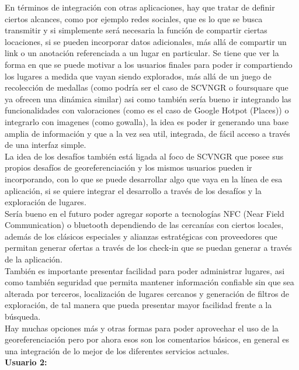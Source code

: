 \documentclass[10pt,letterpaper]{article}
\begin{document}
En términos de integración con otras aplicaciones, hay que tratar de definir ciertos alcances, como por ejemplo redes sociales, que es lo que se busca transmitir y si simplemente será necesaria la función de compartir ciertas locaciones, si se pueden incorporar datos adicionales, más allá de compartir un link o un anotación referenciada a un lugar en particular. Se tiene que ver la forma en que se puede motivar a los usuarios finales para poder ir compartiendo los lugares a medida que vayan siendo explorados, más allá de un juego de recolección de medallas (como podría ser el caso de SCVNGR o foursquare que ya ofrecen una dinámica similar) asi como también sería bueno ir integrando las funcionalidades con valoraciones (como es el caso de Google Hotpot (Places)) o integrarlo con imagenes (como gowalla), la idea es poder ir generando una base amplia de información y que a la vez sea util, integrada, de fácil acceso a través de una interfaz simple.\\

La idea de los desafíos también está ligada al foco de SCVNGR que posee sus propios desafíos de georeferenciación y los mismos usuarios pueden ir incorporando, con lo que se puede desarrollar algo que vaya en la línea de esa aplicación, si se quiere integrar el desarrollo a través de los desafíos y la exploración de lugares.\\

Sería bueno en el futuro poder agregar soporte a tecnologías NFC (Near Field Communication) o bluetooth dependiendo de las cercanías con ciertos locales, además de los clásicos especiales y alianzas estratégicas con proveedores que permitan generar ofertas a través de los check-in que se puedan generar a través de la aplicación.\\

También es importante presentar facilidad para poder administrar lugares, asi como también seguridad que permita mantener información confiable sin que sea alterada por terceros, localización de lugares cercanos y generación de filtros de exploración, de tal manera que pueda presentar mayor facilidad frente a la búsqueda.\\

Hay muchas opciones más y otras formas para poder aprovechar el uso de la georeferenciación pero por ahora esos son los comentarios básicos, en general es una integración de lo mejor de los diferentes servicios actuales.\\

\textbf{Usuario 2:}\\
\end{document}
